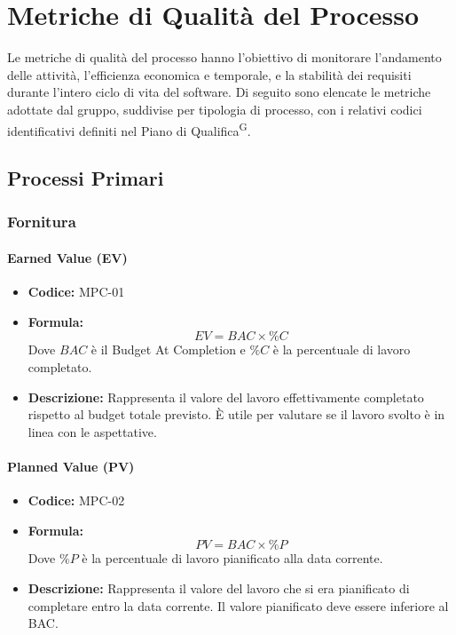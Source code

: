 \documentclass[a4paper, 11pt]{article}
\begin{document}
\section{Metriche di Qualità del Processo}
Le metriche di qualità del processo hanno l'obiettivo di monitorare l'andamento delle attività, l'efficienza economica e temporale, e la stabilità dei requisiti durante l'intero ciclo di vita del software.
Di seguito sono elencate le metriche adottate dal gruppo, suddivise per tipologia di processo, con i relativi codici identificativi definiti nel Piano di Qualifica\textsuperscript{G}.

\subsection{Processi Primari}

\subsubsection{Fornitura}

\paragraph{Earned Value (EV)}
\begin{itemize}
    \item \textbf{Codice:} MPC-01 
    \item \textbf{Formula:} $$EV = BAC \times \%C$$
    Dove $BAC$ è il Budget At Completion e $\%C$ è la percentuale di lavoro completato.
    \item \textbf{Descrizione:} Rappresenta il valore del lavoro effettivamente completato rispetto al budget totale previsto. È utile per valutare se il lavoro svolto è in linea con le aspettative.
\end{itemize}

\paragraph{Planned Value (PV)}
\begin{itemize}
    \item \textbf{Codice:} MPC-02 
    \item \textbf{Formula:} $$PV = BAC \times \%P$$
    Dove $\%P$ è la percentuale di lavoro pianificato alla data corrente.
    \item \textbf{Descrizione:} Rappresenta il valore del lavoro che si era pianificato di completare entro la data corrente. Il valore pianificato deve essere inferiore al BAC.
\end{itemize}
\end{document}
